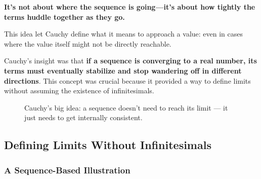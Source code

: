\textbf{It’s not about where the sequence is going—it’s about how tightly the terms huddle together as they go.}



This idea let Cauchy define what it means to approach a value: even in cases where the value itself might not be directly reachable.

Cauchy’s insight was that \textbf{if a sequence is converging to a real number, its terms must eventually stabilize and stop wandering off in different directions}. This concept was crucial because it provided a way to define limits without assuming the existence of infinitesimals.




\begin{figure}[H]
\centering
{}
\caption{Cauchy’s big idea: a sequence doesn’t need to reach its limit — it just needs to get internally consistent.}
\end{figure}



\subsection{Defining Limits Without Infinitesimals}

\subsubsection{A Sequence-Based Illustration}


